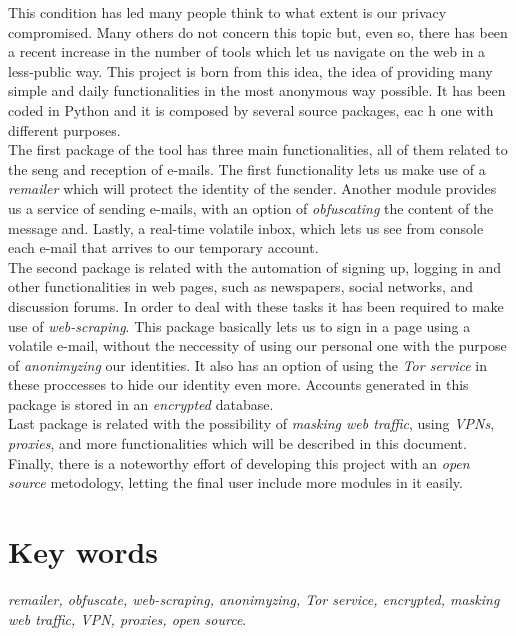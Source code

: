 This condition has led many people think to what extent is our privacy compromised. Many others do not concern this topic but, even so, there has been a recent increase in the number of tools which let us navigate on the web in a less-public way. This project is born from this idea, the idea of providing many simple and daily functionalities in the most anonymous way possible. It has been coded in Python and it is composed by several source packages, eac h one with different purposes.\\
The first package of the tool has three main functionalities, all of them related to the seng and reception of e-mails. The first functionality lets us make use of a \textit{remailer} which will protect the identity of the sender. Another module provides us a service of sending e-mails, with an option of \textit{obfuscating} the content of the message and. Lastly, a real-time volatile inbox, which lets us see from console each e-mail that arrives to our temporary account.\\
The second package is related with the automation of signing up, logging in and other functionalities in web pages, such as newspapers, social networks, and discussion forums. In order to deal with these tasks it has been required to make use of \textit{web-scraping}. This package basically lets us to sign in a page using a volatile e-mail, without the neccessity of using our personal one with the purpose of \textit{anonimyzing} our identities. It also has an option of using the \textit{Tor service} in these proccesses to hide our identity even more. Accounts generated in this package is stored in an \textit{encrypted} database. \\
Last package is related with the possibility of \textit{masking web traffic}, using \textit{VPNs}, \textit{proxies}, and more functionalities which will be described in this document.\\
Finally, there is a noteworthy effort of developing this project with an \textit{open source} metodology, letting the final user include more modules in it easily.\\

\section*{Key words}
\textit{remailer, obfuscate, web-scraping, anonimyzing, Tor service, encrypted, masking web traffic, VPN, proxies, open source}.

